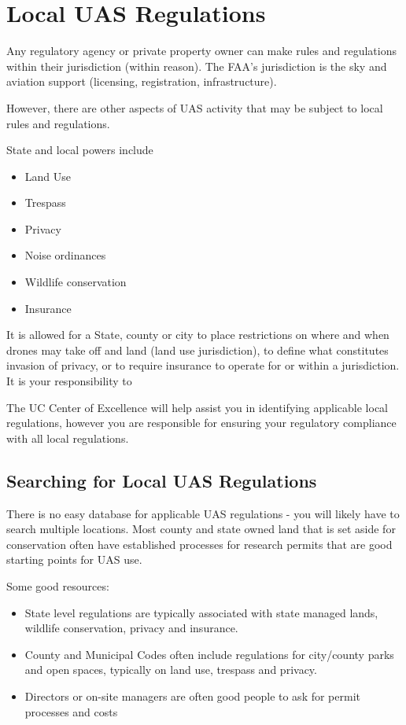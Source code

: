 \documentclass[
]{book}
\providecommand{\tightlist}{%
  \setlength{\itemsep}{0pt}\setlength{\parskip}{0pt}}
\begin{document}
\hypertarget{ch-local-UAS-regulations}{%
\chapter{Local UAS Regulations}\label{ch-local-UAS-regulations}}

Any regulatory agency or private property owner can make rules and regulations within their jurisdiction (within reason). The FAA's jurisdiction is the sky and aviation support (licensing, registration, infrastructure).

However, there are other aspects of UAS activity that may be subject to local rules and regulations.

State and local powers include

\begin{itemize}
\tightlist
\item
  Land Use
\item
  Trespass
\item
  Privacy
\item
  Noise ordinances
\item
  Wildlife conservation
\item
  Insurance
\end{itemize}

It is allowed for a State, county or city to place restrictions on where and when drones may take off and land (land use jurisdiction), to define what constitutes invasion of privacy, or to require insurance to operate for or within a jurisdiction. It is your responsibility to

The UC Center of Excellence will help assist you in identifying applicable local regulations, however you are responsible for ensuring your regulatory compliance with all local regulations.

\hypertarget{searching-for-local-uas-regulations}{%
\section{Searching for Local UAS Regulations}\label{searching-for-local-uas-regulations}}

There is no easy database for applicable UAS regulations - you will likely have to search multiple locations. Most county and state owned land that is set aside for conservation often have established processes for research permits that are good starting points for UAS use.

Some good resources:

\begin{itemize}
\tightlist
\item
  State level regulations are typically associated with state managed lands, wildlife conservation, privacy and insurance.
\item
  County and Municipal Codes often include regulations for city/county parks and open spaces, typically on land use, trespass and privacy.
\item
  Directors or on-site managers are often good people to ask for permit processes and costs
\end{itemize}
\end{document}
